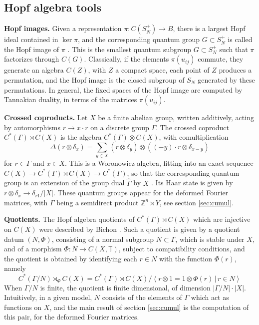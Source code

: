 \documentclass[11pt]{amsart}
\newcommand{\T}{\mathbb T}
\begin{document}
\subsection{Hopf algebra tools}\label{sec:hopf}

\noindent\textbf{Hopf images.} Given a representation $\pi:C(S_N^+)\to B$, there is a largest Hopf ideal contained in $\ker\pi$, and the corresponding quantum group $G\subset S_N^+$ is called the Hopf image of $\pi$ \cite{bb1}. This is the smallest quantum subgroup $G\subset S_N^+$ such that $\pi$ factorizes through $C(G)$. Classically, if the elements $\pi(u_{ij})$ commute, they generate an algebra $C(Z)$, with $Z$ a compact space, each point of $Z$ produces a permutation, and the Hopf image is the closed subgroup of $S_N$ generated by these permutations. In general, the fixed spaces of the Hopf image are computed by Tannakian duality, in terms of the matrices $\pi(u_{ij})$.

\medskip

\noindent\textbf{Crossed coproducts.} Let $X$ be a finite abelian group, written additively, acting by automorphisms $r\to x\cdot r$ on a discrete group $\Gamma$. The crossed coproduct $C^*(\Gamma)\rtimes C(X)$ is the algebra $C^*(\Gamma)\otimes C(X)$, with comultiplication
$$\Delta(r\otimes\delta_x)=\sum_{y\in X}(r\otimes\delta_y)\otimes((-y)\cdot r\otimes\delta_{x-y})$$
for $r\in\Gamma$ and $x\in X$. This is a Woronowicz algebra, fitting into an exact sequence $C(X)\to C^*(\Gamma)\rtimes C(X)\to C^*(\Gamma)$, so that the corresponding quantum group is an extension of the group dual $\widehat{\Gamma}$ by $X$ \cite{ade,schn}. Its Haar state is given by $r\otimes\delta_x\to\delta_{r1}/|X|$. These quantum groups appear for the deformed Fourier matrices, with $\Gamma$ being a semidirect product $\mathbb Z^n\rtimes Y$, see section \ref{sec:cumul}.

\medskip

\noindent\textbf{Quotients.} The Hopf algebra quotients of $C^*(\Gamma)\rtimes C(X)$ which are injective on $C(X)$ were described by Bichon \cite{bic}. Such a quotient is given by a quotient datum $(N,\Phi)$, consisting of a normal subgroup $N\subset\Gamma$, which is stable under $X$, and of a morphism $\Phi:N\to C(X,\T)$, subject to compatibility conditions, and the quotient is obtained by identifying each $r\in N$ with the function $\Phi(r)$, namely
$$C^*(\Gamma/N)\rtimes_\Phi C(X)=C^*(\Gamma)\rtimes C(X)\big/\left<r\otimes1=1\otimes\Phi(r)\,\big|\,r\in N\right>$$
When $\Gamma/N$ is finite, the quotient is finite dimensional, of dimension $|\Gamma/N|\cdot|X|$. Intuitively, in a given model, $N$ consists of the elements of $\Gamma$ which act as functions on $X$, and the main result of section \ref{sec:cumul} is the computation of this pair, for the deformed Fourier matrices.
\end{document}
